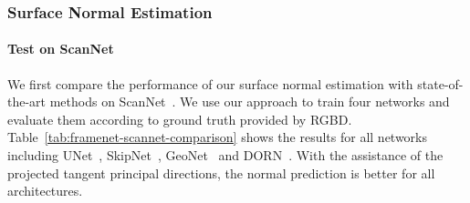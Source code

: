 \subsubsection{Surface Normal Estimation}
\label{sec:framenet-normal}

\paragraph{Test on ScanNet}
We first compare the performance of our surface normal estimation with state-of-the-art methods on ScanNet~\cite{dai2017scannet}. 
We use our approach to train four networks and evaluate them according to ground truth provided by RGBD. Table~\ref{tab:framenet-scannet-comparison} shows the results for all networks including UNet~\cite{ronneberger2015u}, SkipNet~\cite{bansal2016marr}, GeoNet~\cite{qi2018geonet} and DORN~\cite{fu2018deep}. With the assistance of the projected tangent principal directions, the normal prediction is better for all architectures.

